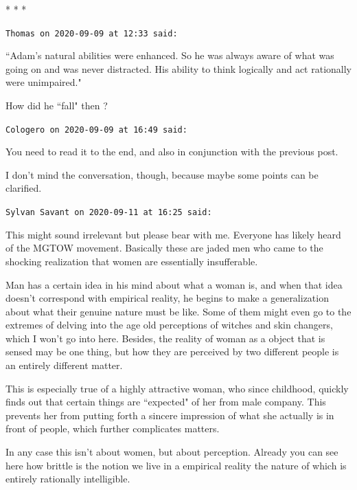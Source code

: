 
\begin{center}* * *\end{center}

\begin{footnotesize}\begin{sffamily}



\texttt{Thomas on 2020-09-09 at 12:33 said: }

``Adam's natural abilities were enhanced. So he was always aware of what was going on and was never distracted. His ability to think logically and act rationally were unimpaired."

How did he ``fall" then ?


\hfill

\texttt{Cologero on 2020-09-09 at 16:49 said: }

You need to read it to the end, and also in conjunction with the previous post.

I don't mind the conversation, though, because maybe some points can be clarified.


\hfill

\texttt{Sylvan Savant on 2020-09-11 at 16:25 said: }

This might sound irrelevant but please bear with me. Everyone has likely heard of the MGTOW movement. Basically these are jaded men who came to the shocking realization that women are essentially insufferable. 

Man has a certain idea in his mind about what a woman is, and when that idea doesn't correspond with empirical reality, he begins to make a generalization about what their genuine nature must be like. Some of them might even go to the extremes of delving into the age old perceptions of witches and skin changers, which I won't go into here. Besides, the reality of woman as a object that is sensed may be one thing, but how they are perceived by two different people is an entirely different matter.

This is especially true of a highly attractive woman, who since childhood, quickly finds out that certain things are ``expected" of her from male company. This prevents her from putting forth a sincere impression of what she actually is in front of people, which further complicates matters.

In any case this isn't about women, but about perception. Already you can see here how brittle is the notion we live in a empirical reality the nature of which is entirely rationally intelligible. 


\end{sffamily}
\end{footnotesize}
